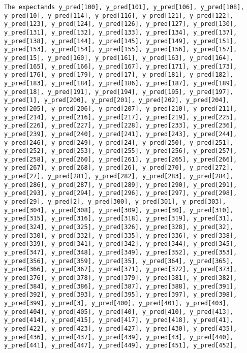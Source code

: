 \documentclass[
  letterpaper,
  DIV=11,
  numbers=noendperiod]{scrartcl}
\begin{document}
\begin{verbatim}
The expectands y_pred[100], y_pred[101], y_pred[106], y_pred[108],
y_pred[10], y_pred[114], y_pred[116], y_pred[121], y_pred[122],
y_pred[123], y_pred[124], y_pred[126], y_pred[127], y_pred[130],
y_pred[131], y_pred[132], y_pred[133], y_pred[134], y_pred[137],
y_pred[138], y_pred[144], y_pred[145], y_pred[149], y_pred[151],
y_pred[153], y_pred[154], y_pred[155], y_pred[156], y_pred[157],
y_pred[15], y_pred[160], y_pred[161], y_pred[163], y_pred[164],
y_pred[165], y_pred[166], y_pred[167], y_pred[171], y_pred[173],
y_pred[176], y_pred[179], y_pred[17], y_pred[181], y_pred[182],
y_pred[183], y_pred[184], y_pred[186], y_pred[187], y_pred[189],
y_pred[18], y_pred[191], y_pred[194], y_pred[195], y_pred[197],
y_pred[1], y_pred[200], y_pred[201], y_pred[202], y_pred[204],
y_pred[205], y_pred[206], y_pred[207], y_pred[210], y_pred[211],
y_pred[214], y_pred[216], y_pred[217], y_pred[219], y_pred[225],
y_pred[226], y_pred[227], y_pred[228], y_pred[233], y_pred[236],
y_pred[239], y_pred[240], y_pred[241], y_pred[243], y_pred[244],
y_pred[246], y_pred[249], y_pred[24], y_pred[250], y_pred[251],
y_pred[252], y_pred[253], y_pred[255], y_pred[256], y_pred[257],
y_pred[258], y_pred[260], y_pred[261], y_pred[265], y_pred[266],
y_pred[267], y_pred[268], y_pred[26], y_pred[270], y_pred[272],
y_pred[27], y_pred[281], y_pred[282], y_pred[283], y_pred[284],
y_pred[286], y_pred[287], y_pred[289], y_pred[290], y_pred[291],
y_pred[293], y_pred[294], y_pred[296], y_pred[297], y_pred[298],
y_pred[29], y_pred[2], y_pred[300], y_pred[301], y_pred[303],
y_pred[304], y_pred[308], y_pred[309], y_pred[30], y_pred[310],
y_pred[315], y_pred[316], y_pred[318], y_pred[319], y_pred[31],
y_pred[324], y_pred[325], y_pred[326], y_pred[328], y_pred[32],
y_pred[330], y_pred[332], y_pred[335], y_pred[336], y_pred[338],
y_pred[339], y_pred[341], y_pred[342], y_pred[344], y_pred[345],
y_pred[347], y_pred[348], y_pred[349], y_pred[352], y_pred[353],
y_pred[356], y_pred[359], y_pred[35], y_pred[364], y_pred[365],
y_pred[366], y_pred[367], y_pred[371], y_pred[372], y_pred[373],
y_pred[376], y_pred[378], y_pred[379], y_pred[381], y_pred[382],
y_pred[384], y_pred[386], y_pred[387], y_pred[388], y_pred[391],
y_pred[392], y_pred[393], y_pred[395], y_pred[397], y_pred[398],
y_pred[399], y_pred[3], y_pred[400], y_pred[401], y_pred[403],
y_pred[404], y_pred[405], y_pred[40], y_pred[410], y_pred[413],
y_pred[414], y_pred[415], y_pred[417], y_pred[418], y_pred[41],
y_pred[422], y_pred[423], y_pred[427], y_pred[430], y_pred[435],
y_pred[436], y_pred[437], y_pred[439], y_pred[43], y_pred[440],
y_pred[441], y_pred[447], y_pred[449], y_pred[451], y_pred[452],

\end{verbatim}
\end{document}

